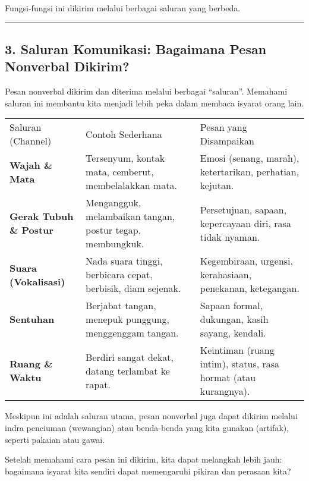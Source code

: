 \documentclass[
  letterpaper,
  DIV=11,
  numbers=noendperiod]{scrreprt}
\begin{document}
Fungsi-fungsi ini dikirim melalui berbagai saluran yang berbeda.

\begin{center}\rule{0.5\linewidth}{0.5pt}\end{center}

\subsection{3. Saluran Komunikasi: Bagaimana Pesan Nonverbal
Dikirim?}\label{saluran-komunikasi-bagaimana-pesan-nonverbal-dikirim-1}

Pesan nonverbal dikirim dan diterima melalui berbagai ``saluran''.
Memahami saluran ini membantu kita menjadi lebih peka dalam membaca
isyarat orang lain.

\begin{longtable}[]{@{}
  >{\raggedright\arraybackslash}p{}
  >{\raggedright\arraybackslash}p{}
  >{\raggedright\arraybackslash}p{}@{}}
\toprule\noalign{}
\endhead
\bottomrule\noalign{}
\endlastfoot
Saluran (Channel) & Contoh Sederhana & Pesan yang Disampaikan \\
\textbf{Wajah \& Mata} & Tersenyum, kontak mata, cemberut, membelalakkan
mata. & Emosi (senang, marah), ketertarikan, perhatian, kejutan. \\
\textbf{Gerak Tubuh \& Postur} & Mengangguk, melambaikan tangan, postur
tegap, membungkuk. & Persetujuan, sapaan, kepercayaan diri, rasa tidak
nyaman. \\
\textbf{Suara (Vokalisasi)} & Nada suara tinggi, berbicara cepat,
berbisik, diam sejenak. & Kegembiraan, urgensi, kerahasiaan, penekanan,
ketegangan. \\
\textbf{Sentuhan} & Berjabat tangan, menepuk punggung, menggenggam
tangan. & Sapaan formal, dukungan, kasih sayang, kendali. \\
\textbf{Ruang \& Waktu} & Berdiri sangat dekat, datang terlambat ke
rapat. & Keintiman (ruang intim), status, rasa hormat (atau
kurangnya). \\
\end{longtable}

Meskipun ini adalah saluran utama, pesan nonverbal juga dapat dikirim
melalui indra penciuman (wewangian) atau benda-benda yang kita gunakan
(artifak), seperti pakaian atau gawai.

Setelah memahami cara pesan ini dikirim, kita dapat melangkah lebih
jauh: bagaimana isyarat kita sendiri dapat memengaruhi pikiran dan
perasaan kita?
\end{document}

